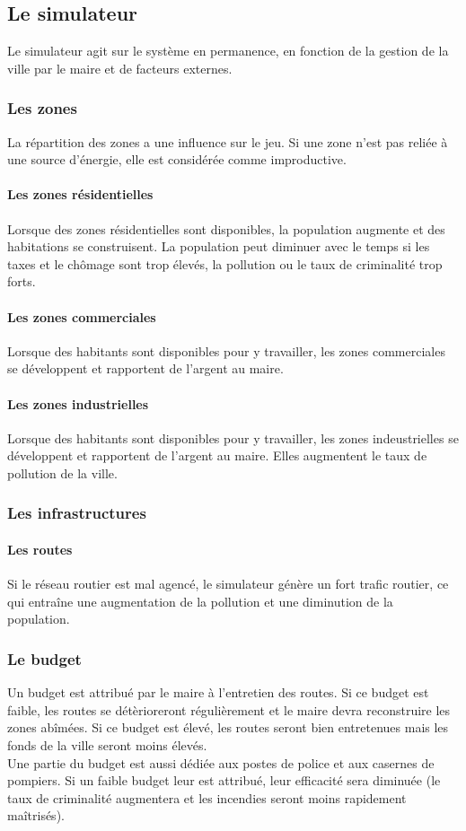 \subsection{Le simulateur}
Le simulateur agit sur le système en permanence, en fonction de la gestion de la ville par le maire et de facteurs externes.

\subsubsection{Les zones}
La répartition des zones a une influence sur le jeu. Si une zone n'est pas reliée à une source d'énergie, elle est considérée comme improductive.
\paragraph{Les zones résidentielles}
Lorsque des zones résidentielles sont disponibles, la population augmente et des habitations se construisent. La population peut diminuer avec le temps si les taxes et le chômage sont trop élevés, la pollution ou le taux de criminalité trop forts.
\paragraph{Les zones commerciales}
Lorsque des habitants sont disponibles pour y travailler, les zones commerciales se développent et rapportent de l'argent au maire.
\paragraph{Les zones industrielles}
Lorsque des habitants sont disponibles pour y travailler, les zones indeustrielles se développent et rapportent de l'argent au maire. Elles augmentent le taux de pollution de la ville.

\subsubsection{Les infrastructures}
\paragraph{Les routes}
Si le réseau routier est mal agencé, le simulateur génère un fort trafic routier, ce qui entraîne une augmentation de la pollution et une diminution de la population.

\subsubsection{Le budget}
Un budget est attribué par le maire à l'entretien des routes. Si ce budget est faible, les routes se détèrioreront régulièrement et le maire devra reconstruire les zones abîmées. Si ce budget est élevé, les routes seront bien entretenues mais les fonds de la ville seront moins élevés.\\
Une partie du budget est aussi dédiée aux postes de police et aux casernes de pompiers. Si un faible budget leur est attribué, leur efficacité sera diminuée (le taux de criminalité augmentera et les incendies seront moins rapidement maîtrisés).

